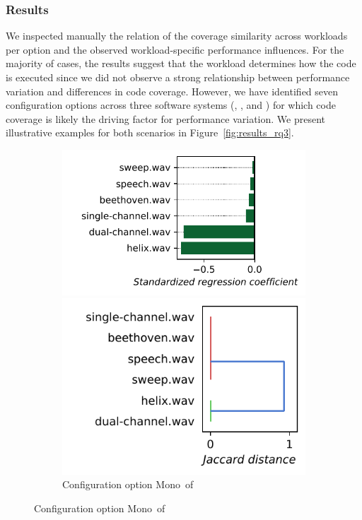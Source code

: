 \subsubsection{Results}
We inspected manually the relation of the coverage similarity across workloads per option and the observed workload-specific performance influences.  For the majority of cases, the results suggest that the workload determines how the code is executed since we did not observe a strong relationship between performance variation and differences in code coverage. However, we have identified seven configuration options across three software systems (\jumper, \kanzi, and \dconvert) for which code coverage is likely the driving factor for performance variation. We present illustrative examples for both scenarios in Figure~\ref{fig:results_rq3}.
\begin{figure}
	\centering
	\begin{subfigure}{0.99\linewidth}
		\begin{minipage}{0.5\linewidth}
			\includegraphics[width=\linewidth]{images/plots/jump3r_Mono_influences.pdf}
		\end{minipage}
		\begin{minipage}{0.5\linewidth}
			\includegraphics[width=0.9\linewidth]{images/plots/jump3r_Mono_workloads.pdf}
		\end{minipage}
		\caption{Configuration option \guillemotleft\textsf{Mono}\guillemotright~of \jumper}
		\label{fig:results_rq3_jump3r}
	\end{subfigure}
	

\end{figure}
